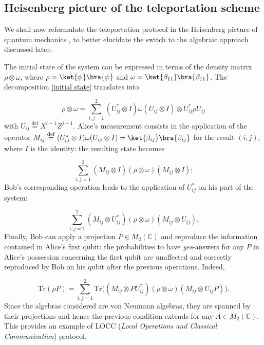 \documentclass[a4paper,11pt]{article}
\newcommand{\eqdef}{\overset{\mathrm{def}}{=}}
\begin{document}
\subsection{Heisenberg picture of the teleportation scheme}

We shall now reformulate the teleportation protocol in the Heisenberg picture of quantum mechanics \cite{Bedard} \cite{Conlon}, to better elucidate the switch to the algebraic approach discussed later.

The initial state of the system can be expressed in terms of the density matrix $\rho \otimes \omega$, where $\rho = \ket{\psi} \bra{\psi}$ and $\omega = \ket{\beta_{11}} \bra{\beta_{11}}$. The decomposition \ref{initial state} translates into

\begin{equation}
    \rho \otimes \omega = \sum_{i,j=1}^2 (U_{ij}^* \otimes I) \omega (U_{ij} \otimes I) \otimes U_{ij}^* \rho U_{ij}
\end{equation}
%
with $U_{ij} \eqdef X^{i-1} Z^{j-1}$. Alice's measurement consists in the application of the operator $M_{ij} \eqdef (U_{ij}^* \otimes I) \omega (U_{ij} \otimes I) = \ket{\beta_{ij}} \bra{\beta_{ij}}$ for the result $(i,j)$, where $I$ is the identity: the resulting state becomes

\begin{equation}
    \sum_{i,j=1}^2 (M_{ij} \otimes I)(\rho \otimes \omega)(M_{ij} \otimes I) \text{;}
\end{equation}
%
Bob's corresponding operation leads to the application of $U_{ij}^*$ on his part of the system:

\begin{equation}
    \sum_{i,j=1}^2 (M_{ij} \otimes U_{ij}^*)(\rho \otimes \omega)(M_{ij} \otimes U_{ij}) \text{.}
\end{equation}
%
Finally, Bob can apply a projection $P \in M_2(\mathbb{C})$ and reproduce the information contained in Alice's first qubit: the probabilities to have \textit{yes}-answers for any $P$ in Alice's possession concerning the first qubit are unaffected and correctly reproduced by Bob on his qubit after the previous operations. Indeed,

\begin{equation}
    \mathrm{Tr}(\rho P) = \sum_{i,j=1}^2 \mathrm{Tr} \big( (M_{ij} \otimes P U_{ij}^*)(\rho \otimes \omega)(M_{ij} \otimes U_{ij} P) \big) \text{.}
    \label{Success}
\end{equation}
%
Since the algebras considered are von Neumann algebras, they are spanned by their projections and hence the previous condition extends for any $A \in M_2(\mathbb{C})$. This provides an example of LOCC (\textit{Local Operations and Classical Communication}) protocol.
\end{document}
